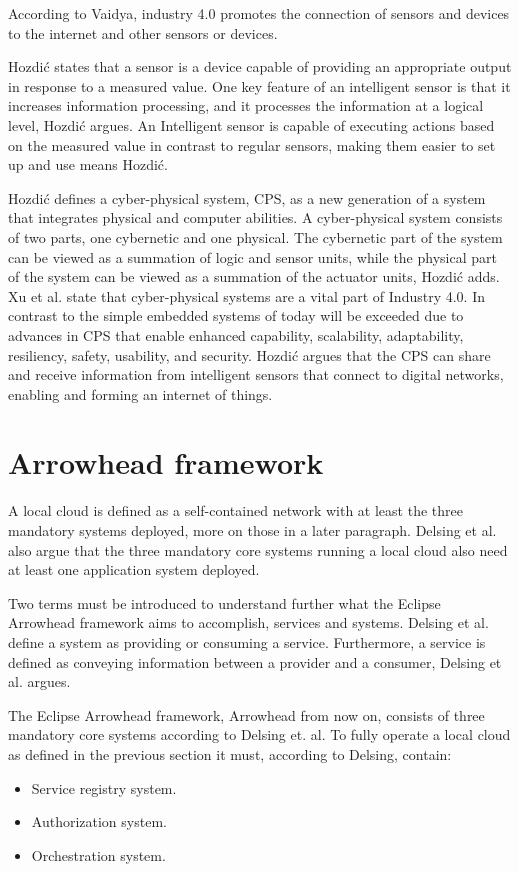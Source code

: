 According to Vaidya, industry 4.0 promotes the connection of sensors and devices to the internet and other sensors or devices.\cite{Vaidya2018} 

Hozdić states that a sensor is a device capable of providing an appropriate output in response to a measured value.
One key feature of an intelligent sensor is that it increases information processing, and it processes the information at a logical level, Hozdić argues.
An Intelligent sensor  is capable of executing actions based on the measured value in contrast to regular sensors, making them easier to set up and use means Hozdić.\cite{Hozdic2015} 

Hozdić defines a cyber-physical system, CPS, as a new generation of a system that integrates physical and computer abilities.
A cyber-physical system consists of two parts, one cybernetic and one physical.
The cybernetic part of the system can be viewed as a summation of logic and sensor units, while the physical part of the system can be viewed as a summation of the actuator units, Hozdić adds.
Xu et al. state that cyber-physical systems are a vital part of Industry 4.0. In contrast to the simple embedded systems of today will be exceeded due to advances in CPS that enable enhanced capability, scalability, adaptability, resiliency, safety, usability, and security.\cite{Xu2018}
Hozdić argues that the CPS can share and receive information from intelligent sensors that connect to digital networks, enabling and forming an internet of things.\cite{Hozdic2015}
 
\section{Arrowhead framework}
A local cloud is defined as a self-contained network with at least the three mandatory systems deployed, more on those in a later paragraph. 
Delsing et al. also argue that the three mandatory core systems running a local cloud also need at least one application system deployed.\cite{Delsing2017}

Two terms must be introduced to understand further what the Eclipse Arrowhead framework aims to accomplish, services and systems.
Delsing et al. define a system as providing or consuming a service.
Furthermore, a service is defined as conveying information between a provider and a consumer, Delsing et al. argues.\cite{Delsing2017}

The Eclipse Arrowhead framework, Arrowhead from now on, consists of three mandatory core systems according to Delsing et. al.
To fully operate a local cloud as defined in the previous section it must, according to Delsing, contain:
\begin{itemize}
    \item Service registry system.
    \item Authorization system. 
    \item Orchestration system.\cite{Delsing2017}
\end{itemize} 

